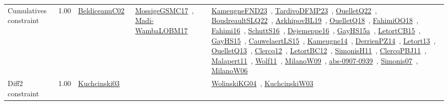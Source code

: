 {\begin{longtable}{p{3cm}r>{\raggedright\arraybackslash}p{6cm}>{\raggedright\arraybackslash}p{6cm}>{\raggedright\arraybackslash}p{8cm}}
\index{Cumulatives constraint}\index{Constraints!Cumulatives constraint}Cumulatives constraint &  1.00 & \href{../works/BeldiceanuC02.pdf}{BeldiceanuC02}~\cite{BeldiceanuC02} & \href{../works/MossigeGSMC17.pdf}{MossigeGSMC17}~\cite{MossigeGSMC17}, \href{../works/Madi-WambaLOBM17.pdf}{Madi-WambaLOBM17}~\cite{Madi-WambaLOBM17} & \href{../works/KameugneFND23.pdf}{KameugneFND23}~\cite{KameugneFND23}, \href{../works/TardivoDFMP23.pdf}{TardivoDFMP23}~\cite{TardivoDFMP23}, \href{../works/OuelletQ22.pdf}{OuelletQ22}~\cite{OuelletQ22}, \href{../works/BoudreaultSLQ22.pdf}{BoudreaultSLQ22}~\cite{BoudreaultSLQ22}, \href{../works/ArkhipovBL19.pdf}{ArkhipovBL19}~\cite{ArkhipovBL19}, \href{../works/OuelletQ18.pdf}{OuelletQ18}~\cite{OuelletQ18}, \href{../works/FahimiOQ18.pdf}{FahimiOQ18}~\cite{FahimiOQ18}, \href{../works/Fahimi16.pdf}{Fahimi16}~\cite{Fahimi16}, \href{../works/SchuttS16.pdf}{SchuttS16}~\cite{SchuttS16}, \href{../works/Dejemeppe16.pdf}{Dejemeppe16}~\cite{Dejemeppe16}, \href{../works/GayHS15a.pdf}{GayHS15a}~\cite{GayHS15a}, \href{../works/LetortCB15.pdf}{LetortCB15}~\cite{LetortCB15}, \href{../works/GayHS15.pdf}{GayHS15}~\cite{GayHS15}, \href{../works/CauwelaertLS15.pdf}{CauwelaertLS15}~\cite{CauwelaertLS15}, \href{../works/Kameugne14.pdf}{Kameugne14}~\cite{Kameugne14}, \href{../works/DerrienPZ14.pdf}{DerrienPZ14}~\cite{DerrienPZ14}, \href{../works/Letort13.pdf}{Letort13}~\cite{Letort13}, \href{../works/OuelletQ13.pdf}{OuelletQ13}~\cite{OuelletQ13}, \href{../works/Clercq12.pdf}{Clercq12}~\cite{Clercq12}, \href{../works/LetortBC12.pdf}{LetortBC12}~\cite{LetortBC12}, \href{../works/SimonisH11.pdf}{SimonisH11}~\cite{SimonisH11}, \href{../works/ClercqPBJ11.pdf}{ClercqPBJ11}~\cite{ClercqPBJ11}, \href{../works/Malapert11.pdf}{Malapert11}~\cite{Malapert11}, \href{../works/Wolf11.pdf}{Wolf11}~\cite{Wolf11}, \href{../works/MilanoW09.pdf}{MilanoW09}~\cite{MilanoW09}, \href{../works/abs-0907-0939.pdf}{abs-0907-0939}~\cite{abs-0907-0939}, \href{../works/Simonis07.pdf}{Simonis07}~\cite{Simonis07}, \href{../works/MilanoW06.pdf}{MilanoW06}~\cite{MilanoW06}\\
\index{Diff2 constraint}\index{Constraints!Diff2 constraint}Diff2 constraint &  1.00 & \href{../works/Kuchcinski03.pdf}{Kuchcinski03}~\cite{Kuchcinski03} &  & \href{../works/WolinskiKG04.pdf}{WolinskiKG04}~\cite{WolinskiKG04}, \href{../works/KuchcinskiW03.pdf}{KuchcinskiW03}~\cite{KuchcinskiW03}\\

\end{longtable}}
